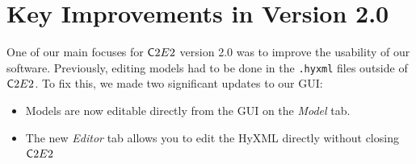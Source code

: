 \documentclass{tufte-book} %
\begin{document}







\chapter{Key Improvements in Version 2.0}
One of our main focuses for ${{\mathsf C2E2}}$ version 2.0 was to improve the usability of our software. Previously, editing models had to be done in the \texttt{.hyxml} files outside of ${{\mathsf C2E2}}$. To fix this, we made two significant updates to our GUI:
\label{version}
\begin{itemize}
\item Models are now editable directly from the GUI on the \emph{Model} tab.
\item The new \emph{Editor} tab allows you to edit the HyXML directly without closing ${{\mathsf C2E2}}$
\end{itemize}
\end{document}
